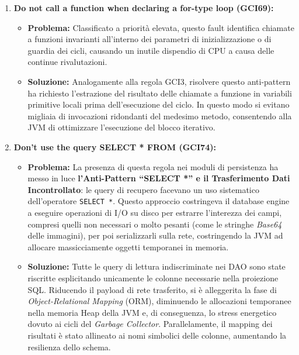 \begin{enumerate}
    \item \textbf{Do not call a function when declaring a for-type loop (GCI69):}
    \begin{itemize}
        \item \textbf{Problema:} Classificato a priorità elevata, questo fault identifica chiamate a funzioni invarianti all'interno dei parametri di inizializzazione o di guardia dei cicli, causando un inutile dispendio di CPU a causa delle continue rivalutazioni.
        \item \textbf{Soluzione:} Analogamente alla regola GCI3, risolvere questo anti-pattern ha richiesto l'estrazione del risultato delle chiamate a funzione in variabili primitive locali prima dell'esecuzione del ciclo. In questo modo si evitano migliaia di invocazioni ridondanti del medesimo metodo, consentendo alla JVM di ottimizzare l'esecuzione del blocco iterativo.
    \end{itemize}
    
    \item \textbf{Don't use the query SELECT * FROM (GCI74):}
    \begin{itemize}
        \item \textbf{Problema:} La presenza di questa regola nei moduli di persistenza ha messo in luce \textbf{l'Anti-Pattern ``SELECT *'' e il Trasferimento Dati Incontrollato}: le query di recupero facevano un uso sistematico dell'operatore \texttt{SELECT *}. Questo approccio costringeva il database engine a eseguire operazioni di I/O su disco per estrarre l'interezza dei campi, compresi quelli non necessari o molto pesanti (come le stringhe \textit{Base64} delle immagini), per poi serializzarli sulla rete, costringendo la JVM ad allocare massicciamente oggetti temporanei in memoria.
        \item \textbf{Soluzione:} Tutte le query di lettura indiscriminate nei DAO sono state riscritte esplicitando unicamente le colonne necessarie nella proiezione SQL. Riducendo il payload di rete trasferito, si è alleggerita la fase di \textit{Object-Relational Mapping} (ORM), diminuendo le allocazioni temporanee nella memoria Heap della JVM e, di conseguenza, lo stress energetico dovuto ai cicli del \textit{Garbage Collector}. Parallelamente, il mapping dei risultati è stato allineato ai nomi simbolici delle colonne, aumentando la resilienza dello schema.
    \end{itemize}
\end{enumerate}

